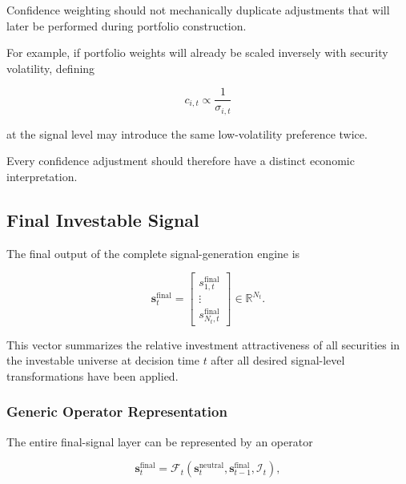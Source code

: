 \documentclass[11pt,a4paper]{article}
\begin{document}
Confidence weighting should not mechanically duplicate adjustments that will
later be performed during portfolio construction.

For example, if portfolio weights will already be scaled inversely with
security volatility, defining

\begin{equation}
c_{i,t}
\propto
\frac{1}{\sigma_{i,t}}
\end{equation}

at the signal level may introduce the same low-volatility preference twice.

Every confidence adjustment should therefore have a distinct economic
interpretation.


\subsection{Final Investable Signal}
\label{subsec:final_investable_signal}

The final output of the complete signal-generation engine is

\begin{equation}
\boxed{
\mathbf{s}_t^{\mathrm{final}}
=
\begin{bmatrix}
s_{1,t}^{\mathrm{final}}
\\
\vdots
\\
s_{N_t,t}^{\mathrm{final}}
\end{bmatrix}
\in
\mathbb{R}^{N_t}.
}
\end{equation}

This vector summarizes the relative investment attractiveness of all securities
in the investable universe at decision time $t$ after all desired signal-level
transformations have been applied.


\subsubsection{Generic Operator Representation}

The entire final-signal layer can be represented by an operator

\begin{equation}
\boxed{
\mathbf{s}_t^{\mathrm{final}}
=
\mathcal{F}_t
\left(
\mathbf{s}_t^{\mathrm{neutral}},
\mathbf{s}_{t-1}^{\mathrm{final}},
\mathcal{I}_t
\right),
}
\end{equation}
\end{document}
